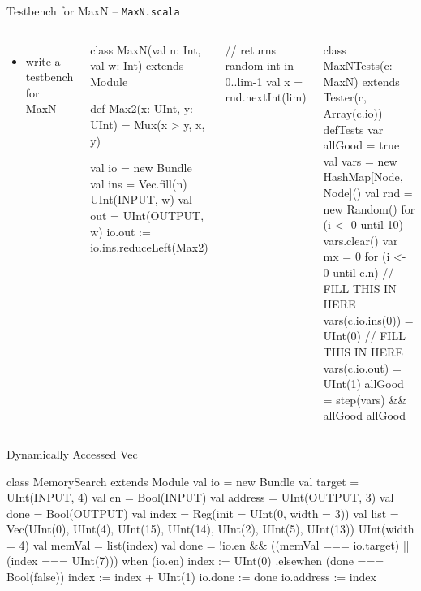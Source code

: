 \documentclass[xcolor=pdflatex,dvipsnames,table]{beamer}
\begin{document}
\begin{frame}[fragile]{Testbench for MaxN -- \tt MaxN.scala}
\begin{columns}

\begin{itemize}
\item write a testbench for MaxN
\end{itemize}

{
\begin{scala}
class MaxN(val n: Int, val w: Int) 
    extends Module {

  def Max2(x: UInt, y: UInt) = 
    Mux(x > y, x, y)

  val io = new Bundle {
    val ins = Vec.fill(n){ UInt(INPUT, w) }
    val out = UInt(OUTPUT, w)
  }
  io.out := io.ins.reduceLeft(Max2)
}
\end{scala}
}
\begin{scala}
// returns random int in 0..lim-1
val x = rnd.nextInt(lim) 
\end{scala}


{
\begin{scala}
class MaxNTests(c: MaxN) 
    extends Tester(c, Array(c.io)) {
  defTests {
    var allGood = true
    val vars = 
       new HashMap[Node, Node]()
    val rnd  = new Random()
    for (i <- 0 until 10) {
      vars.clear()
      var mx = 0
      for (i <- 0 until c.n) {
        // FILL THIS IN HERE
        vars(c.io.ins(0)) = UInt(0)
      }
      // FILL THIS IN HERE
      vars(c.io.out) = UInt(1)
      allGood = step(vars) && allGood
    }
    allGood
  }
}
\end{scala}
}
\end{columns}
\end{frame}

\begin{frame}[fragile]{Dynamically Accessed Vec}
\begin{scala}
class MemorySearch extends Module {
  val io = new Bundle {
    val target  = UInt(INPUT,  4)
    val en      = Bool(INPUT)
    val address = UInt(OUTPUT, 3)
    val done    = Bool(OUTPUT)
  }
  val index  = Reg(init = UInt(0, width = 3))
  val list   = Vec(UInt(0), UInt(4), UInt(15), UInt(14), 
                   UInt(2), UInt(5), UInt(13)){ UInt(width = 4) }
  val memVal = list(index)
  val done = !io.en && ((memVal === io.target) || (index === UInt(7)))
  when (io.en) {
    index := UInt(0)
  } .elsewhen (done === Bool(false)) {
    index := index + UInt(1)
  }
  io.done    := done
  io.address := index
}
\end{scala}
\end{frame}
\end{document}
